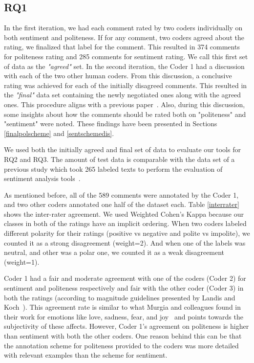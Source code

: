 \subsection{RQ1 }\label{gt}

In the first iteration, we had each comment rated by two coders individually on both sentiment and politeness. If for any comment, two coders agreed about the rating, we finalized that label for the comment. This resulted in 374 comments for politeness rating and 285 comments for sentiment rating. We call this first set of data as the \textit{"agreed"} set.
In the second iteration, the Coder 1 had a discussion with each of the two other human coders. From this discussion, a conclusive rating was achieved for each of the initially disagreed comments. This resulted in the \textit{"final" }data set containing the newly negotiated ones along with the agreed ones. This procedure aligns with a previous paper~\cite{ahmed2017senticr}. Also, during this discussion, some insights about how the comments should be rated both on "politeness" and "sentiment" were noted. These findings have been presented in Sections \ref{finalpolscheme} and \ref{sentschemedis}.

We used both the initially agreed and final set of data to evaluate our tools for RQ2 and RQ3. The amount of test data is comparable with the data set of a previous study which took 265 labeled texts to perform the evaluation of sentiment analysis tools~\cite{jongeling2017negative}.

As mentioned before, all of the 589 comments were annotated by the Coder 1, and two other coders annotated one half of the dataset each. Table \ref{interrater} shows the inter-rater agreement. We used Weighted Cohen's Kappa because our classes in both of the ratings have an implicit ordering. When two coders labeled different polarity for their ratings (positive vs negative and polite vs impolite), we counted it as a strong disagreement (weight=2). And when one of the labels was neutral, and other was a polar one, we counted it as a weak disagreement (weight=1).

Coder 1 had a fair and moderate agreement with one of the coders (Coder 2) for sentiment and politeness respectively and fair with the other coder (Coder 3) in both the ratings (according to magnitude guidelines presented by Landis and Koch~\cite{landis1977measurement}). This agreement rate is similar to what Murgia and colleagues found in their work for emotions like love, sadness, fear, and joy~\cite{murgia2014developers} and points towards the subjectivity of these affects.
However, 
Coder 1's agreement on politeness 
is higher than sentiment 
with both the other coders. 
One reason behind this can be 
that the annotation scheme for politeness 
provided to the coders 
was more detailed with relevant examples 
than the scheme for sentiment. 

